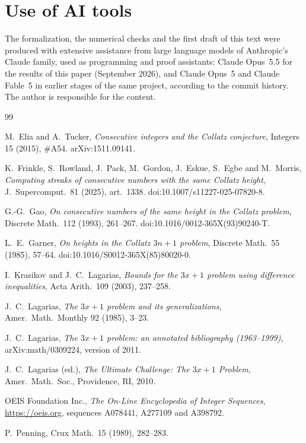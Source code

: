 \documentclass[11pt]{amsart}
\theoremstyle{definition}
\theoremstyle{remark}
\begin{document}
\section*{Use of AI tools}
The formalization, the numerical checks and the first draft of this text were produced with extensive assistance from large language models of Anthropic's Claude family, used as programming and proof assistants: Claude Opus~5.5 for the results of this paper (September 2026), and Claude Opus~5 and Claude Fable~5 in earlier stages of the same project, according to the commit history. The author is responsible for the content.

\begin{thebibliography}{99}

 M.~Elia and A.~Tucker, \emph{Consecutive integers and the Collatz conjecture}, Integers 15 (2015), \#A54. arXiv:1511.09141.

 K.~Frinkle, S.~Rowland, J.~Pack, M.~Gordon, J.~Eskue, S.~Egbe and M.~Morris, \emph{Computing streaks of consecutive numbers with the same Collatz height}, J.~Supercomput.\ 81 (2025), art.~1338. doi:10.1007/s11227-025-07820-8.

 G.-G.~Gao, \emph{On consecutive numbers of the same height in the Collatz problem}, Discrete Math.\ 112 (1993), 261--267. doi:10.1016/0012-365X(93)90240-T.

 L.~E.~Garner, \emph{On heights in the Collatz $3n+1$ problem}, Discrete Math.\ 55 (1985), 57--64. doi:10.1016/S0012-365X(85)80020-0.

 I.~Krasikov and J.~C.~Lagarias, \emph{Bounds for the $3x+1$ problem using difference inequalities}, Acta Arith.\ 109 (2003), 237--258.

 J.~C.~Lagarias, \emph{The $3x+1$ problem and its generalizations}, Amer.\ Math.\ Monthly 92 (1985), 3--23.

 J.~C.~Lagarias, \emph{The $3x+1$ problem: an annotated bibliography (1963--1999)}, arXiv:math/0309224, version of 2011.

 J.~C.~Lagarias (ed.), \emph{The Ultimate Challenge: The $3x+1$ Problem}, Amer.\ Math.\ Soc., Providence, RI, 2010.

 OEIS Foundation Inc., \emph{The On-Line Encyclopedia of Integer Sequences}, \url{https://oeis.org}, sequences A078441, A277109 and A398792.

 P.~Penning, Crux Math.\ 15 (1989), 282--283.


\end{thebibliography}
\end{document}
